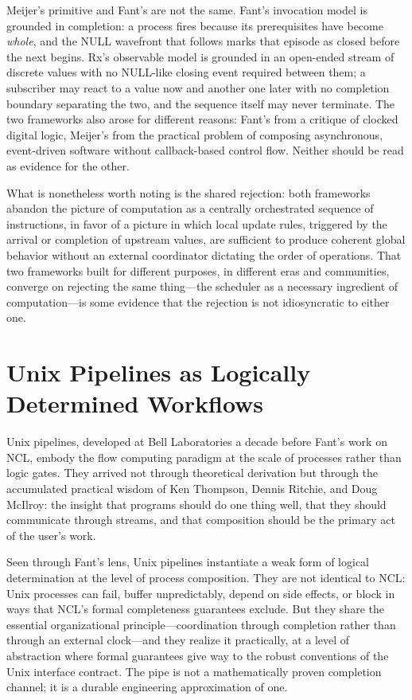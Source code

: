 \documentclass[12pt, a4paper]{article}
\begin{document}
Meijer's primitive and Fant's are not the same. Fant's invocation
model is grounded in completion: a process fires because its
prerequisites have become \emph{whole}, and the NULL wavefront
that follows marks that episode as closed before the next begins.
Rx's observable model is grounded in an open-ended stream of
discrete values with no NULL-like closing event required between
them; a subscriber may react to a value now and another one later
with no completion boundary separating the two, and the sequence
itself may never terminate. The two frameworks also arose for
different reasons: Fant's from a critique of clocked digital
logic, Meijer's from the practical problem of composing
asynchronous, event-driven software without callback-based
control flow. Neither should be read as evidence for the other.

What is nonetheless worth noting is the shared rejection: both
frameworks abandon the picture of computation as a centrally
orchestrated sequence of instructions, in favor of a picture in
which local update rules, triggered by the arrival or completion
of upstream values, are sufficient to produce coherent global
behavior without an external coordinator dictating the order of
operations. That two frameworks built for different purposes, in
different eras and communities, converge on rejecting the same
thing---the scheduler as a necessary ingredient of computation---is
some evidence that the rejection is not idiosyncratic to either
one.

\section{Unix Pipelines as Logically Determined Workflows}

Unix pipelines, developed at Bell Laboratories a decade before Fant's
work on NCL, embody the flow computing paradigm at the scale of
processes rather than logic gates. They arrived not through theoretical
derivation but through the accumulated practical wisdom of Ken Thompson,
Dennis Ritchie, and Doug McIlroy: the insight that programs should do
one thing well, that they should communicate through streams, and that
composition should be the primary act of the user's work.

Seen through Fant's lens, Unix pipelines instantiate a weak form of
logical determination at the level of process composition. They are not
identical to NCL: Unix processes can fail, buffer unpredictably, depend
on side effects, or block in ways that NCL's formal completeness
guarantees exclude. But they share the essential organizational
principle---coordination through completion rather than through an
external clock---and they realize it practically, at a level of
abstraction where formal guarantees give way to the robust conventions
of the Unix interface contract. The pipe is not a mathematically proven
completion channel; it is a durable engineering approximation of one.
\end{document}

